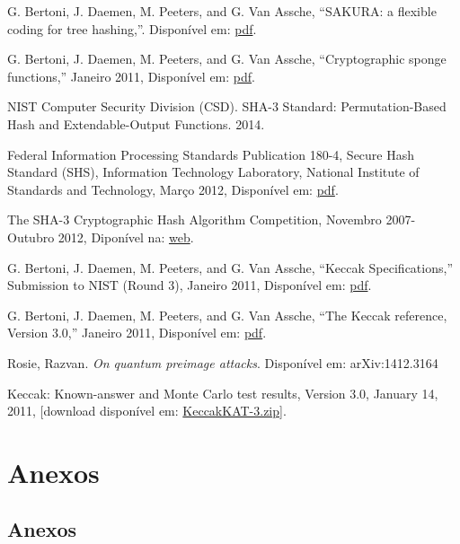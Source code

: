 \documentclass[12pt, a4paper]{article}
\begin{document}
\pagebreak
\begin{thebibliography}{9}
 G. Bertoni, J. Daemen, M. Peeters, and G. Van Assche, “SAKURA:
a flexible coding for tree hashing,”. Disponível em:
\href{http://keccak.noekeon.org/Sakura.pdf}{pdf}.

 G. Bertoni, J. Daemen, M. Peeters, and G. Van Assche,
“Cryptographic sponge functions,” Janeiro 2011, Disponível em:
\href{http://sponge.noekeon.org/CSF-0.1.pdf}{pdf}.

 NIST Computer Security Division (CSD). SHA-3 Standard:
Permutation-Based Hash and Extendable-Output Functions. 2014.

 Federal Information Processing Standards Publication 180-4,
Secure Hash Standard (SHS), Information Technology Laboratory, National
Institute of Standards and Technology, Março 2012, Disponível em:
\href{http://csrc.nist.gov/publications/fips/fips180-4/fips-180-4.pdf}{pdf}.

 The SHA-3 Cryptographic Hash Algorithm Competition, Novembro
2007-Outubro 2012, Diponível na:
\href{http://csrc.nist.gov/groups/ST/hash/sha-3/index.html}{web}.

 G. Bertoni, J. Daemen, M. Peeters, and G. Van Assche, “Keccak
Specifications,” Submission to NIST (Round 3), Janeiro 2011, Disponível em:
\href{http://keccak.noekeon.org/Keccak-submission-3.pdf}{pdf}.

 G. Bertoni, J. Daemen, M. Peeters, and G. Van Assche, “The
Keccak reference, Version 3.0,” Janeiro 2011, Disponível em:
\href{http://keccak.noekeon.org/Keccak-reference-3.0.pdf}{pdf}.

 Rosie, Razvan. \textit{On quantum preimage attacks}.
Disponível em: arXiv:1412.3164

 Keccak: Known-answer and Monte Carlo test results, Version
3.0, January 14, 2011, [download disponível em:
\href{http://keccak.noekeon.org/KeccakKAT-3.zip}{KeccakKAT-3.zip}].
\end{thebibliography}

\smallskip
\pagebreak

\section{Anexos}

\subsection{Anexos}
\label{saidasprograma}

\end{document}
